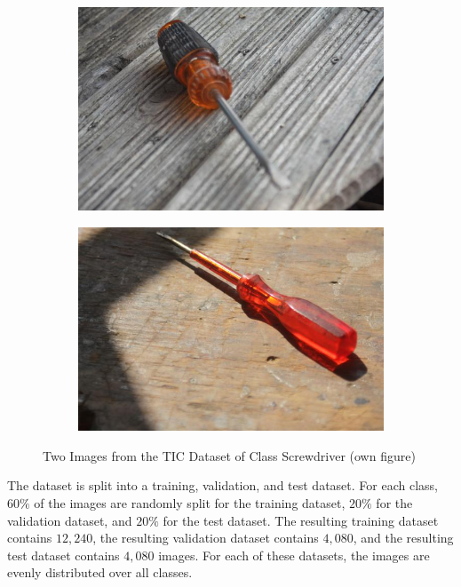 \begin{figure}[H]
	\centering
	\begin{subfigure}[b]{0.45\textwidth}
		\centering
		\includegraphics[width=\textwidth]{img/screwdriver1}
	\end{subfigure}
	\hfill
	\begin{subfigure}[b]{0.45\textwidth}
		\centering
		\includegraphics[width=\textwidth]{img/screwdriver2}
	\end{subfigure}
	\caption{Two Images from the TIC Dataset of Class Screwdriver (own figure)}
	\label{fig:screwdriver}
\end{figure}
The dataset is split into a training, validation, and test dataset. For each class, $60\%$ of the images are randomly split for the training dataset, $20\%$ for the validation dataset, and $20\%$ for the test dataset. The resulting training dataset contains $12{,}240$, the resulting validation dataset contains $4{,}080$, and the resulting test dataset contains $4{,}080$ images. For each of these datasets, the images are evenly distributed over all classes.
